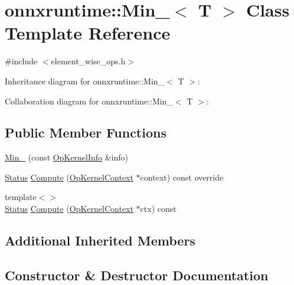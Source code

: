 \hypertarget{classonnxruntime_1_1Min__6}{}\section{onnxruntime\+:\+:Min\+\_$<$ T $>$ Class Template Reference}
\label{classonnxruntime_1_1Min__6}


{\ttfamily \#include $<$element\+\_\+wise\+\_\+ops.\+h$>$}



Inheritance diagram for onnxruntime\+:\+:Min\+\_$<$ T $>$\+:


Collaboration diagram for onnxruntime\+:\+:Min\+\_$<$ T $>$\+:
\subsection*{Public Member Functions}
\begin{DoxyCompactItemize}
\item 
\mbox{\hyperlink{classonnxruntime_1_1Min__6_add652eb0a5bc010d2222796575b96cbf}{Min\+\_}} (const \mbox{\hyperlink{classonnxruntime_1_1OpKernelInfo}{Op\+Kernel\+Info}} \&info)
\item 
\mbox{\hyperlink{classonnxruntime_1_1common_1_1Status}{Status}} \mbox{\hyperlink{classonnxruntime_1_1Min__6_a56323e33a57d2bc86d21bd3f21fff70c}{Compute}} (\mbox{\hyperlink{classonnxruntime_1_1OpKernelContext}{Op\+Kernel\+Context}} $\ast$context) const override
\item 
{\footnotesize template$<$$>$ }\\\mbox{\hyperlink{classonnxruntime_1_1common_1_1Status}{Status}} \mbox{\hyperlink{classonnxruntime_1_1Min__6_ad9fb93014523edd7e994d2ecdb20714a}{Compute}} (\mbox{\hyperlink{classonnxruntime_1_1OpKernelContext}{Op\+Kernel\+Context}} $\ast$ctx) const
\end{DoxyCompactItemize}
\subsection*{Additional Inherited Members}


\subsection{Constructor \& Destructor Documentation}
\mbox{\label{classonnxruntime_1_1Min__6_add652eb0a5bc010d2222796575b96cbf}} 
